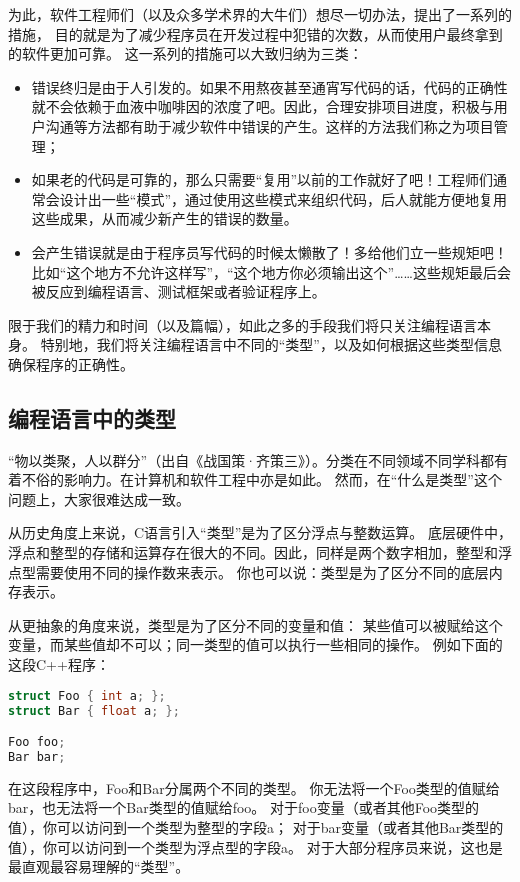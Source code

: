 \documentclass[../main.tex]{subfiles}
\begin{document}
  \indent 为此，软件工程师们（以及众多学术界的大牛们）想尽一切办法，提出了一系列的措施，
  目的就是为了减少程序员在开发过程中犯错的次数，从而使用户最终拿到的软件更加可靠。
  这一系列的措施可以大致归纳为三类：\cite{sf}
  \begin{itemize}
    \item 错误终归是由于人引发的。如果不用熬夜甚至通宵写代码的话，代码的正确性就不会依赖于血液中咖啡因的浓度了吧。因此，合理安排项目进度，积极与用户沟通等方法都有助于减少软件中错误的产生。这样的方法我们称之为项目管理；
    \item 如果老的代码是可靠的，那么只需要“复用”以前的工作就好了吧！工程师们通常会设计出一些“模式”，通过使用这些模式来组织代码，后人就能方便地复用这些成果，从而减少新产生的错误的数量。
    \item 会产生错误就是由于程序员写代码的时候太懒散了！多给他们立一些规矩吧！比如“这个地方不允许这样写”，“这个地方你必须输出这个”……这些规矩最后会被反应到编程语言、测试框架或者验证程序上。
  \end{itemize}

  \indent 限于我们的精力和时间（以及篇幅），如此之多的手段我们将只关注编程语言本身。
  特别地，我们将关注编程语言中不同的“类型”，以及如何根据这些类型信息确保程序的正确性。

  \subsection{编程语言中的类型}
  \indent “物以类聚，人以群分”（出自《战国策·齐策三》）。分类在不同领域不同学科都有着不俗的影响力。在计算机和软件工程中亦是如此。
  然而，在“什么是类型”这个问题上，大家很难达成一致。
  
  \indent 从历史角度上来说，C语言引入“类型”是为了区分浮点与整数运算\cite{typeytb}。
  底层硬件中，浮点和整型的存储和运算存在很大的不同。因此，同样是两个数字相加，整型和浮点型需要使用不同的操作数来表示。
  你也可以说：类型是为了区分不同的底层内存表示。

  \indent 从更抽象的角度来说，类型是为了区分不同的变量和值：
  某些值可以被赋给这个变量，而某些值却不可以；同一类型的值可以执行一些相同的操作。
  例如下面的这段C++程序：

\begin{lstlisting}[language=c++]
struct Foo { int a; };
struct Bar { float a; };

Foo foo;
Bar bar;
\end{lstlisting}

  \indent 在这段程序中，Foo和Bar分属两个不同的类型。
  你无法将一个Foo类型的值赋给bar，也无法将一个Bar类型的值赋给foo。
  对于foo变量（或者其他Foo类型的值），你可以访问到一个类型为整型的字段a；
  对于bar变量（或者其他Bar类型的值），你可以访问到一个类型为浮点型的字段a。
  对于大部分程序员来说，这也是最直观最容易理解的“类型”。
\end{document}
